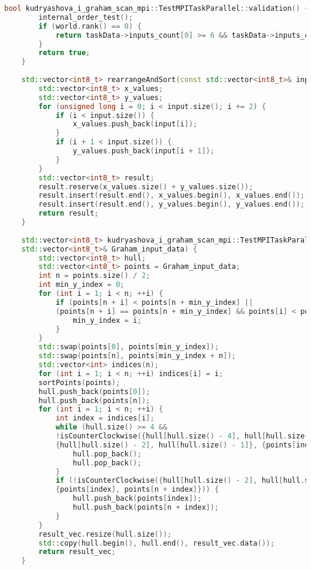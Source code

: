 \documentclass[a4paper,12pt]{article}
\begin{document}
\begin{lstlisting}[language=C++]
	bool kudryashova_i_graham_scan_mpi::TestMPITaskParallel::validation() {
		internal_order_test();
		if (world.rank() == 0) {
			return taskData->inputs_count[0] >= 6 && taskData->inputs_count[0] % 2 == 0;
		}
		return true;
	}
	
	std::vector<int8_t> rearrangeAndSort(const std::vector<int8_t>& input) {
		std::vector<int8_t> x_values;
		std::vector<int8_t> y_values;
		for (unsigned long i = 0; i < input.size(); i += 2) {
			if (i < input.size()) {
				x_values.push_back(input[i]);
			}
			if (i + 1 < input.size()) {
				y_values.push_back(input[i + 1]);
			}
		}
		std::vector<int8_t> result;
		result.reserve(x_values.size() + y_values.size());
		result.insert(result.end(), x_values.begin(), x_values.end());
		result.insert(result.end(), y_values.begin(), y_values.end());
		return result;
	}
	
	std::vector<int8_t> kudryashova_i_graham_scan_mpi::TestMPITaskParallel::runGrahamScan(
	std::vector<int8_t>& Graham_input_data) {
		std::vector<int8_t> hull;
		std::vector<int8_t> points = Graham_input_data;
		int n = points.size() / 2;
		int min_y_index = 0;
		for (int i = 1; i < n; ++i) {
			if (points[n + i] < points[n + min_y_index] ||
			(points[n + i] == points[n + min_y_index] && points[i] < points[min_y_index])) {
				min_y_index = i;
			}
		}
		std::swap(points[0], points[min_y_index]);
		std::swap(points[n], points[min_y_index + n]);
		std::vector<int> indices(n);
		for (int i = 1; i < n; ++i) indices[i] = i;
		sortPoints(points);
		hull.push_back(points[0]);
		hull.push_back(points[n]);
		for (int i = 1; i < n; ++i) {
			int index = indices[i];
			while (hull.size() >= 4 &&
			!isCounterClockwise({hull[hull.size() - 4], hull[hull.size() - 3]},
			{hull[hull.size() - 2], hull[hull.size() - 1]}, {points[index], points[n + index]})) {
				hull.pop_back();
				hull.pop_back();
			}
			if (!isCounterClockwise({hull[hull.size() - 2], hull[hull.size() - 1]}, {points[index], points[n + index]},
			{points[index], points[n + index]})) {
				hull.push_back(points[index]);
				hull.push_back(points[n + index]);
			}
		}
		result_vec.resize(hull.size());
		std::copy(hull.begin(), hull.end(), result_vec.data());
		return result_vec;
	}
	

\end{lstlisting}
\end{document}
